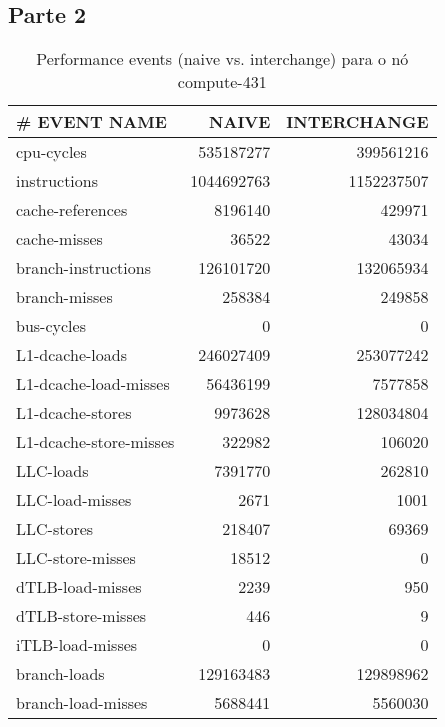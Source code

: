 \documentclass[conference,compsoc]{IEEEtran}
\begin{document}
\begin{itemize}





\section{Parte 2 }


  \begin{table}[H]
  \caption{Performance events (naive vs. interchange) para o nó compute-431}
  \label{table:search_events}
  \centering
  \begin{tabular}{ | l | r | r |   }

  \hline
  \# EVENT NAME	 & NAIVE  & INTERCHANGE \\ \hline 
  cpu-cycles  & 535187277  & 399561216         \\ \hline       
  instructions &       1044692763 &      1152237507      \\ \hline
  cache-references &      8196140 &    429971      \\ \hline
  cache-misses     &    36522 &     43034      \\ \hline
  branch-instructions & 126101720 & 132065934      \\ \hline
  branch-misses     &   258384 &  249858      \\ \hline
  bus-cycles       &       0 &    0      \\ \hline
   L1-dcache-loads  &  246027409 & 253077242     \\ \hline
 L1-dcache-load-misses & 56436199 & 7577858   \\ \hline
  L1-dcache-stores   &  9973628 & 128034804     \\ \hline
  L1-dcache-store-misses & 322982 &  106020     \\ \hline
  LLC-loads           &    7391770 & 262810     \\ \hline
  LLC-load-misses      &  2671 &  1001     \\ \hline
  LLC-stores          &  218407 & 69369     \\ \hline
  LLC-store-misses    &   18512 &    0     \\ \hline
  dTLB-load-misses    &   2239 & 950     \\ \hline
  dTLB-store-misses   &    446 &  9     \\ \hline
  iTLB-load-misses   &   0 &   0     \\ \hline
  branch-loads   & 129163483 & 129898962  \\ \hline    
  branch-load-misses &  5688441 & 5560030      \\ \hline
  \end{tabular}
  \end{table}
  

\end{itemize}
\end{document}
